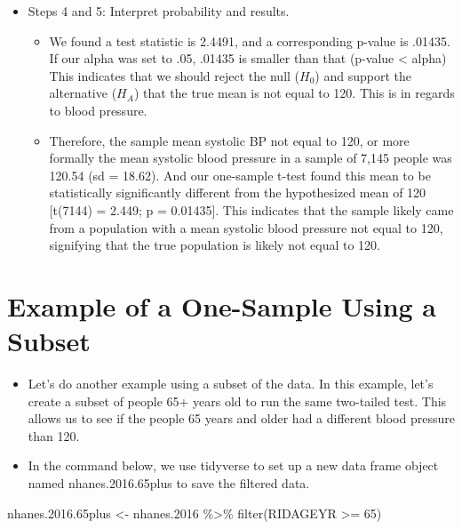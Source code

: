 \documentclass[
  letterpaper,
  DIV=11,
  numbers=noendperiod]{scrreprt}
\newenvironment{Shaded}{\begin{snugshade}}{\end{snugshade}}
\newcommand{\DecValTok}[1]{\textcolor[rgb]{0.68,0.00,0.00}{#1}}
\newcommand{\FloatTok}[1]{\textcolor[rgb]{0.68,0.00,0.00}{#1}}
\newcommand{\FunctionTok}[1]{\textcolor[rgb]{0.28,0.35,0.67}{#1}}
\newcommand{\NormalTok}[1]{\textcolor[rgb]{0.00,0.23,0.31}{#1}}
\newcommand{\OtherTok}[1]{\textcolor[rgb]{0.00,0.23,0.31}{#1}}
\newcommand{\SpecialCharTok}[1]{\textcolor[rgb]{0.37,0.37,0.37}{#1}}
\providecommand{\tightlist}{%
  \setlength{\itemsep}{0pt}\setlength{\parskip}{0pt}}\usepackage{longtable,booktabs,array}
\begin{document}
\begin{itemize}
\tightlist
\item
  Steps 4 and 5: Interpret probability and results.

  \begin{itemize}
  \tightlist
  \item
    We found a test statistic is 2.4491, and a corresponding p-value is
    .01435. If our alpha was set to .05, .01435 is smaller than that
    (p-value \textless{} alpha) This indicates that we should reject the
    null (\(H_0\)) and support the alternative (\(H_A\)) that the true
    mean is not equal to 120. This is in regards to blood pressure.
  \item
    Therefore, the sample mean systolic BP not equal to 120, or more
    formally the mean systolic blood pressure in a sample of 7,145
    people was 120.54 (sd = 18.62). And our one-sample t-test found this
    mean to be statistically significantly different from the
    hypothesized mean of 120 {[}t(7144) = 2.449; p = 0.01435{]}. This
    indicates that the sample likely came from a population with a mean
    systolic blood pressure not equal to 120, signifying that the true
    population is likely not equal to 120.
  \end{itemize}
\end{itemize}

\section{Example of a One-Sample Using a
Subset}\label{example-of-a-one-sample-using-a-subset}

\begin{itemize}
\tightlist
\item
  Let's do another example using a subset of the data. In this example,
  let's create a subset of people 65+ years old to run the same
  two-tailed test. This allows us to see if the people 65 years and
  older had a different blood pressure than 120.
\item
  In the command below, we use tidyverse to set up a new data frame
  object named nhanes.2016.65plus to save the filtered data.
\end{itemize}

\begin{Shaded}
\begin{Highlighting}[]
\NormalTok{nhanes.}\FloatTok{2016.65}\NormalTok{plus }\OtherTok{\textless{}{-}}\NormalTok{ nhanes}\FloatTok{.2016} \SpecialCharTok{\%\textgreater{}\%}
    \FunctionTok{filter}\NormalTok{(RIDAGEYR }\SpecialCharTok{\textgreater{}=} \DecValTok{65}\NormalTok{)}
\end{Highlighting}
\end{Shaded}
\end{document}
